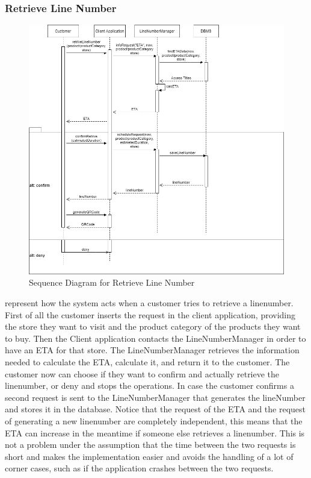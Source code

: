 \subsubsection{Retrieve Line Number}
\begin{figure}[H]
    \centering
    \includegraphics[height=0.6\textwidth]{Images/CustomerSequenceDiagrams/RetriveLineNumberSequenceDiagram.png}
    \caption{Sequence Diagram for Retrieve Line Number}
    \label{fig:SDRetrieveLineNumber}
\end{figure}
 represent how the system acts when a customer tries to retrieve a linenumber.
First of all the customer inserts the request in the client application, providing the store they want to visit and the product category of the products they want to buy.
Then the Client application contacts the LineNumberManager in order to have an ETA for that store.
The LineNumberManager retrieves the information needed to calculate the ETA, calculate it, and return it to the customer.
The customer now can choose if they want to confirm and actually retrieve the linenumber, or deny and stops the operations.
In case the customer confirms a second request is sent to the LineNumberManager that generates the lineNumber and stores it in the database.
Notice that the request of the ETA and the request of generating a new linenumber are completely independent, this means that the ETA can increase in the meantime if someone else retrieves a linenumber.
This is not a problem under the assumption that the time between the two requests is short and makes the implementation easier and avoids the handling of a lot of corner cases, such as if the application crashes between the two requests.

